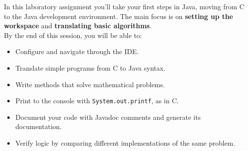 In this laboratory assignment you'll take your first steps in Java, moving from C to the Java development environment. The main focus is on \textbf{setting up the workspace} and \textbf{translating basic algorithms}. \\

By the end of this session, you will be able to:

\begin{itemize}

    \item Configure and navigate through the IDE.

    \item Translate simple programs from C to Java syntax.

    \item Write methods that solve mathematical problems.

    \item Print to the console with \texttt{System.out.printf}, as in C.

    \item Document your code with Javadoc comments and generate its documentation.

    \item Verify logic by comparing different implementations of the same problem.

\end{itemize}

